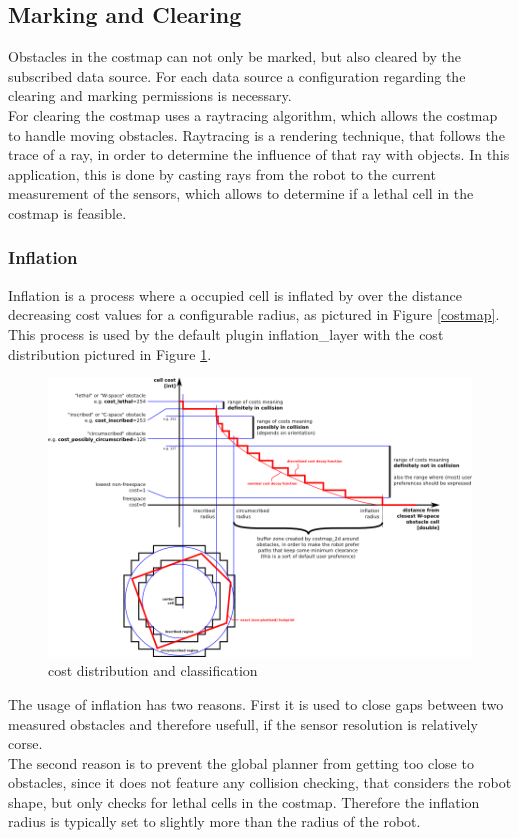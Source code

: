 \subsection{Marking and Clearing}
Obstacles in the costmap can not only be marked, but also cleared by the subscribed data source. For each data source a configuration regarding the clearing and marking permissions is necessary.\\
For clearing the costmap uses a raytracing algorithm, which allows the costmap to handle moving obstacles\cite{costmap}. Raytracing is a rendering technique, that follows the trace of a ray, in order to determine the influence of that ray with objects. 
In this application, this is done by casting rays from the robot to the current measurement of the sensors, which allows to determine if a lethal cell in the costmap is feasible.
\subsubsection{Inflation}
Inflation is a process where a occupied cell is inflated by over the distance decreasing cost values for a configurable radius, as pictured in Figure \ref{costmap}.\\
This process is used by the default plugin inflation\_layer with the cost distribution pictured in Figure \ref{costdistribution}\cite{costmap}.
\begin{figure}[H]
	\centering
	\includegraphics[width=\linewidth]{Pictures/costmapinflation}
	\caption{cost distribution and classification \cite{costmap}}
	\label{costdistribution}
\end{figure}

The usage of inflation has two reasons. First it is used to close gaps between two measured obstacles and therefore usefull, if the sensor resolution is relatively corse.\\
The second reason is to prevent the global planner from getting too close to obstacles, since it does not feature any collision checking, that considers the robot shape, but only checks for lethal cells in the costmap. Therefore the inflation radius is typically set to slightly more than the radius of the robot\cite{costmap}.

